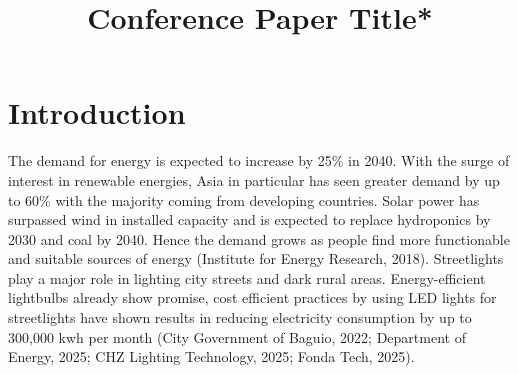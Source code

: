 \documentclass[conference]{IEEEtran}
\begin{document}
\title{Conference Paper Title*\\}

\author{

}

\maketitle

\begin{abstract}
    
\end{abstract}
\section{Introduction}
The demand for energy is expected to increase by 25\% in 2040. With the surge of interest in renewable energies, Asia in particular has seen greater demand by up to 60\% with the majority coming from developing countries. Solar power has surpassed wind in installed capacity and is expected to replace hydroponics by 2030 and coal by 2040. Hence the demand grows as people find more functionable and suitable sources of energy (Institute for Energy Research, 2018). Streetlights play a major role in lighting city streets and dark rural areas. Energy-efficient lightbulbs already show promise, cost efficient practices by using LED lights for streetlights have shown results in reducing electricity consumption by up to 300,000 kwh per month (City Government of Baguio, 2022; Department of Energy, 2025; CHZ Lighting Technology, 2025; Fonda Tech, 2025).
\end{document}
